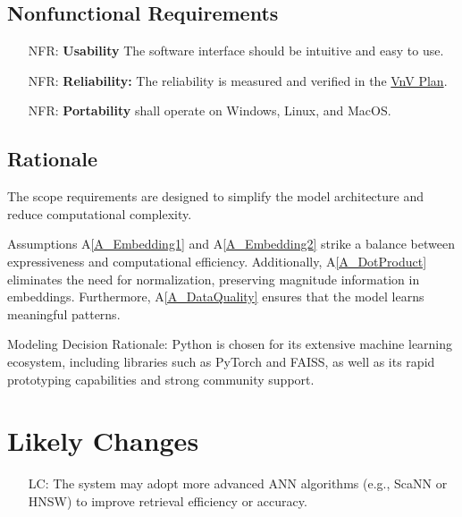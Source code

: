 \documentclass[12pt]{article}
\newcommand{\aref}[1]{A\ref{#1}}
\newcounter{nfrnum} %
\newcounter{lcnum} %
\begin{document}
\subsection{Nonfunctional Requirements}

\noindent \begin{itemize}

\item[NFR\refstepcounter{nfrnum}\thenfrnum \label{NFR_Usability}:]
  \textbf{Usability} The software interface should be intuitive and easy to use.

\item[NFR\refstepcounter{nfrnum}\thenfrnum \label{NFR_Reliability:}:]
  \textbf{Reliability:} The reliability is measured and verified in the \href{https://github.com/V-AS/Two-tower-recommender-system/blob/main/docs/VnVPlan/VnVPlan.pdf}{VnV Plan}.

\item[NFR\refstepcounter{nfrnum}\thenfrnum \label{NFR_Portability}:]
  \textbf{Portability} \progname{} shall operate on Windows, Linux, and MacOS.

\end{itemize}

\subsection{Rationale}

The scope requirements are designed to simplify the model architecture and reduce computational complexity.

Assumptions \aref{A_Embedding1} and \aref{A_Embedding2} strike a balance between expressiveness and computational efficiency. Additionally, \aref{A_DotProduct} eliminates the need for normalization, preserving magnitude information in embeddings. Furthermore, \aref{A_DataQuality} ensures that the model learns meaningful patterns.

Modeling Decision Rationale: 
Python is chosen for its extensive machine learning ecosystem, including libraries such as PyTorch and FAISS, as well as its rapid prototyping capabilities and strong community support.

\section{Likely Changes}    

\noindent \begin{itemize}

\item[LC\refstepcounter{lcnum}\thelcnum\label{LC_advancedANN}:] The system may adopt more advanced ANN algorithms (e.g., ScaNN or HNSW) to improve retrieval efficiency or accuracy.

\end{itemize}
\end{document}
